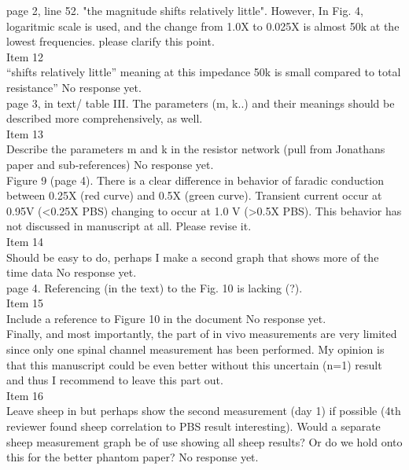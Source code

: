 \documentclass[journal, a4paper]{IEEEtran}
\begin{document}
{{page 2, line 52. "the magnitude shifts relatively little". However, In Fig. 4, logaritmic scale is used, and the change from 1.0X to 0.025X is almost 50k at the lowest frequencies. 
please clarify this point.\\
{\color{OliveGreen}
    Item 12\\
    {\color{Red} ``shifts relatively little'' meaning at this impedance 50k is small compared to total resistance''}
    No response yet.
}\\

page 3, in text/ table III. The parameters (m, k..) and their meanings should be described more comprehensively, as well.\\
{\color{OliveGreen} 
    Item 13\\
    {\color{Red} Describe the parameters m and k in the resistor network (pull from Jonathans paper and sub-references)}
    No response yet.
}\\

Figure 9 (page 4). There is a clear difference in behavior of faradic conduction between 0.25X (red curve) and 0.5X (green curve). Transient current occur at 0.95V (<0.25X PBS) changing to occur at 1.0 V (>0.5X PBS). This behavior has not discussed in manuscript at all. Please revise it.\\
{\color{OliveGreen}
    Item 14\\
    {\color{Red} Should be easy to do, perhaps I make a second graph that shows more of the time data}
    No response yet.
}\\

page 4. Referencing (in the text) to the Fig. 10 is lacking (?).\\
{\color{OliveGreen}
    Item 15\\
    {\color{Red} Include a reference to Figure 10 in the document}
    No response yet.
}\\

Finally, and most importantly, the part of in vivo measurements are very limited since only one spinal channel measurement has been performed. My opinion is that this manuscript could be even better without this uncertain (n=1) result and thus I recommend to leave this part out.\\
{\color{OliveGreen}
    Item 16\\ 
    {\color{Red} Leave sheep in but perhaps show the second measurement (day 1) if possible (4th reviewer found sheep correlation to PBS result interesting). Would a separate sheep measurement graph be of use showing all sheep results? Or do we hold onto this for the better phantom paper?}
    No response yet.
}\\
}

}
\end{document}
